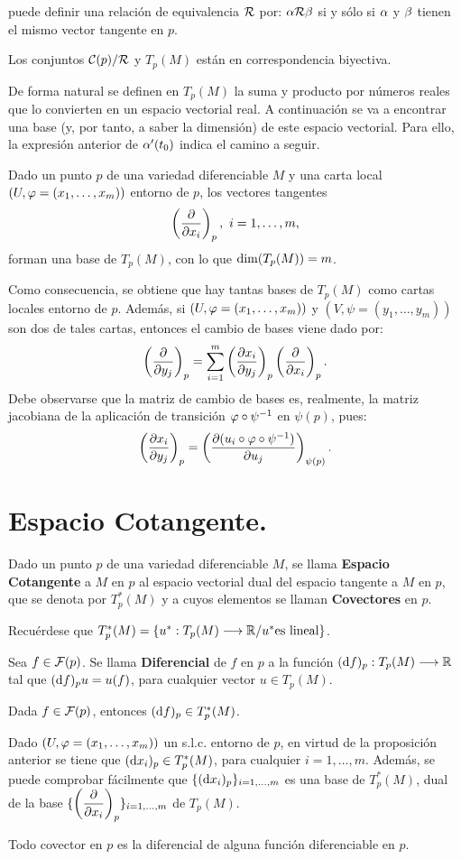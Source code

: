 \documentclass[cursovd_portada.tex]{subfiles}
\begin{document}
puede definir una relaci\'{o}n de equivalencia ${\cal R}$ por: $\alpha{\cal R}\beta$ si y s\'{o}lo si $\alpha$ y $\beta$ tienen el mismo
vector tangente en $p$.
\begin{prop}
Los conjuntos ${\cal C}(p)/{\cal R}$ y $T_p(M)$ est\'{a}n en correspondencia biyectiva.
\end{prop}
De forma natural se definen en $T_p(M)$ la suma y producto por
n\'{u}meros reales que lo convierten en un espacio vectorial real.
A continuaci\'{o}n se va a encontrar una base (y, por tanto, a
saber la dimensi\'{o}n) de este espacio vectorial. Para ello, la
expresi\'{o}n anterior de $\alpha'(t_0)$ indica el camino a seguir.
\begin{teorema}
Dado un punto $p$ de una variedad diferenciable $M$ y una carta local $(U,\varphi=(x_1,\dots ,x_m))$ entorno de $p$,
los vectores tangentes
$$\left(\displaystyle{\frac{\partial}{\partial x_i}}\right)_p,\mbox{ }i=1,\dots ,m,$$
forman una base de $T_p(M)$, con lo que ${\rm dim}(T_p(M))=m$.
\end{teorema}
Como consecuencia, se obtiene que hay tantas bases de $T_p(M)$ como cartas locales entorno de $p$. Adem\'{a}s, si
$(U,\varphi=(x_1,\dots ,x_m))$ y $(V,\psi=(y_1,\dots ,y_m))$ son dos de tales cartas, entonces el cambio de bases
viene dado por:
$$\left( \displaystyle{\frac{\partial}{\partial y_j}}\right)_p=\sum_{i=1}^m\left(\displaystyle{\frac{\partial x_i}{\partial y_j}}\right)_p\left( \displaystyle{\frac{\partial}{\partial x_i}}\right)_p.$$
\hs Debe observarse que la matriz de cambio de bases es, realmente, la matriz jacobiana de la aplicaci\'{o}n de
transici\'{o}n $\varphi\circ\psi^{-1}$ en $\psi(p)$, pues:
$$\left(\displaystyle{\frac{\partial x_i}{\partial y_j}}\right)_p=\left(\displaystyle{\frac{\partial (u_i\circ\varphi\circ\psi^{-1})}{\partial u_j}}\right)_{\psi(p)}.$$
\section{Espacio Cotangente.}
\begin{defi}
Dado un punto $p$ de una variedad diferenciable $M$, se llama {\bf Espacio Cotangente} a $M$ en $p$ al espacio
vectorial dual del espacio tangente a $M$ en $p$, que se denota por $T_p^*(M)$ y a cuyos elementos se llaman {\bf
Covectores} en $p$.
\end{defi}
Recu\'{e}rdese que $T_p^*(M)=\{u^*:T_p(M)\longrightarrow\mathbb{R} /u^* {\rm es}\mbox{ }{\rm lineal}\}$.
\begin{defi}
Sea $f\in{\cal F}(p)$. Se llama {\bf Diferencial} de $f$ en $p$ a la funci\'{o}n $({\rm d} f)_p:T_p(M)\longrightarrow\mathbb{R}$ tal que
$({\rm d} f)_pu=u(f)$, para cualquier vector $u\in T_p(M)$.
\end{defi}
\begin{prop}
Dada $f\in{\cal F}(p)$, entonces $({\rm d} f)_p\in T_p^*(M)$.
\end{prop}
Dado $(U,\varphi=(x_1,\dots ,x_m))$ un s.l.c. entorno de $p$, en virtud de la proposici\'{o}n anterior se tiene que
$({\rm d} x_i)_p\in T_p^*(M)$, para cualquier $i=1,\dots ,m$. Adem\'{a}s, se puede comprobar f\'{a}cilmente que
$\{({\rm d} x_i)_p\}_{i=1,\dots ,m}$ es una base de $T_p^*(M)$, dual de la base
$\{\left(\displaystyle{\frac{\partial}{\partial x_i}}\right)_p\}_{i=1,\dots ,m}$ de $T_p(M)$.
\begin{prop}
Todo covector en $p$ es la diferencial de alguna funci\'{o}n diferenciable en $p$.
\end{prop}
\end{document}
